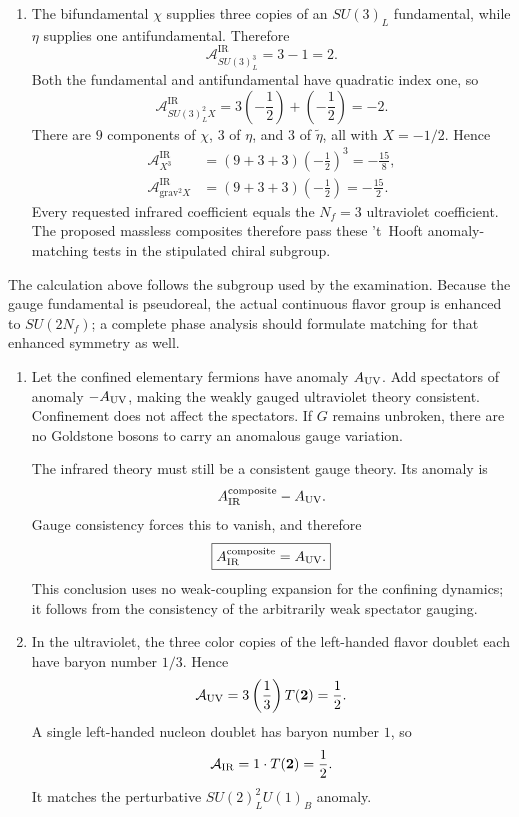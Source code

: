 \begin{enumerate}
\begin{enumerate}
    \item[(vii)]
    The bifundamental \(\chi\) supplies three copies of an
    \(SU(3)_L\) fundamental, while \(\eta\) supplies one
    antifundamental.  Therefore
    \[
      \mathcal A_{SU(3)_L^3}^{\mathrm{IR}}
       =3-1=2.
    \]
    Both the fundamental and antifundamental have quadratic index one, so
    \[
      \mathcal A_{SU(3)_L^2X}^{\mathrm{IR}}
       =3\left(-\frac12\right)
        +\left(-\frac12\right)=-2.
    \]
    There are \(9\) components of \(\chi\), \(3\) of \(\eta\), and
    \(3\) of \(\widetilde\eta\), all with \(X=-1/2\).  Hence
    \[
    \begin{aligned}
      \mathcal A_{X^3}^{\mathrm{IR}}
       &=(9+3+3)\left(-\frac12\right)^3
        =-\frac{15}{8},\\
      \mathcal A_{\mathrm{grav}^2X}^{\mathrm{IR}}
       &=(9+3+3)\left(-\frac12\right)
        =-\frac{15}{2}.
    \end{aligned}
    \]
    Every requested infrared coefficient equals the \(N_f=3\)
    ultraviolet coefficient.  The proposed massless composites therefore
    pass these 't~Hooft anomaly-matching tests in the stipulated chiral
    subgroup.
  \end{enumerate}

  The calculation above follows the subgroup used by the examination.
  Because the gauge fundamental is pseudoreal, the actual continuous
  flavor group is enhanced to \(SU(2N_f)\); a complete phase analysis
  should formulate matching for that enhanced symmetry as well.

  \begin{enumerate}
    \item[(a)]
    Let the confined elementary fermions have anomaly \(A_{\rm UV}\).
    Add spectators of anomaly \(-A_{\rm UV}\), making the weakly gauged
    ultraviolet theory consistent.  Confinement does not affect the
    spectators.  If \(G\) remains unbroken, there are no Goldstone bosons
    to carry an anomalous gauge variation.

    The infrared theory must still be a consistent gauge theory.  Its
    anomaly is
    \[
      A_{\rm IR}^{\rm composite}-A_{\rm UV}.
    \]
    Gauge consistency forces this to vanish, and therefore
    \[
      \boxed{A_{\rm IR}^{\rm composite}=A_{\rm UV}.}
    \]
    This conclusion uses no weak-coupling expansion for the confining
    dynamics; it follows from the consistency of the arbitrarily weak
    spectator gauging.
    \item[(b)]
    In the ultraviolet, the three color copies of the left-handed flavor
    doublet each have baryon number \(1/3\).  Hence
    \[
      \mathcal A_{\rm UV}
        =3\left(\frac13\right)T(\mathbf2)
        =\frac12.
    \]
    A single left-handed nucleon doublet has baryon number \(1\), so
    \[
      \mathcal A_{\rm IR}=1\cdot T(\mathbf2)=\frac12.
    \]
    It matches the perturbative \(SU(2)_L^2U(1)_B\) anomaly.


\end{enumerate}
\end{enumerate}
